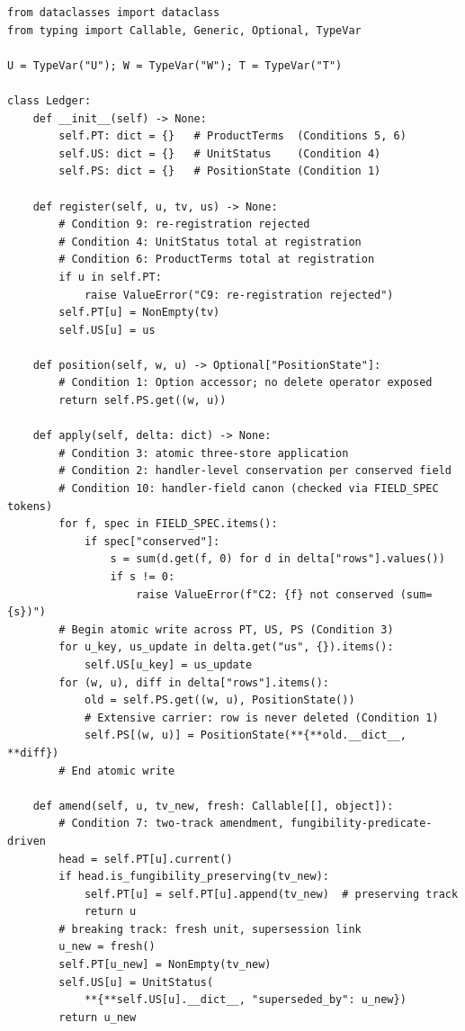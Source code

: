 \documentclass[11pt,a4paper]{article}
\begin{document}
\begin{lstlisting}[language=pythonstyle]
from dataclasses import dataclass
from typing import Callable, Generic, Optional, TypeVar

U = TypeVar("U"); W = TypeVar("W"); T = TypeVar("T")

class Ledger:
    def __init__(self) -> None:
        self.PT: dict = {}   # ProductTerms  (Conditions 5, 6)
        self.US: dict = {}   # UnitStatus    (Condition 4)
        self.PS: dict = {}   # PositionState (Condition 1)

    def register(self, u, tv, us) -> None:
        # Condition 9: re-registration rejected
        # Condition 4: UnitStatus total at registration
        # Condition 6: ProductTerms total at registration
        if u in self.PT:
            raise ValueError("C9: re-registration rejected")
        self.PT[u] = NonEmpty(tv)
        self.US[u] = us

    def position(self, w, u) -> Optional["PositionState"]:
        # Condition 1: Option accessor; no delete operator exposed
        return self.PS.get((w, u))

    def apply(self, delta: dict) -> None:
        # Condition 3: atomic three-store application
        # Condition 2: handler-level conservation per conserved field
        # Condition 10: handler-field canon (checked via FIELD_SPEC tokens)
        for f, spec in FIELD_SPEC.items():
            if spec["conserved"]:
                s = sum(d.get(f, 0) for d in delta["rows"].values())
                if s != 0:
                    raise ValueError(f"C2: {f} not conserved (sum={s})")
        # Begin atomic write across PT, US, PS (Condition 3)
        for u_key, us_update in delta.get("us", {}).items():
            self.US[u_key] = us_update
        for (w, u), diff in delta["rows"].items():
            old = self.PS.get((w, u), PositionState())
            # Extensive carrier: row is never deleted (Condition 1)
            self.PS[(w, u)] = PositionState(**{**old.__dict__, **diff})
        # End atomic write

    def amend(self, u, tv_new, fresh: Callable[[], object]):
        # Condition 7: two-track amendment, fungibility-predicate-driven
        head = self.PT[u].current()
        if head.is_fungibility_preserving(tv_new):
            self.PT[u] = self.PT[u].append(tv_new)  # preserving track
            return u
        # breaking track: fresh unit, supersession link
        u_new = fresh()
        self.PT[u_new] = NonEmpty(tv_new)
        self.US[u] = UnitStatus(
            **{**self.US[u].__dict__, "superseded_by": u_new})
        return u_new


\end{lstlisting}
\end{document}
